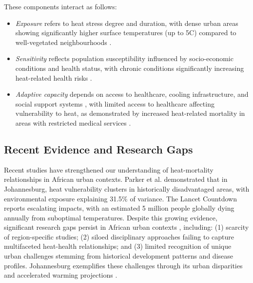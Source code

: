 These components interact as follows:
\begin{itemize}
    \item \textit{Exposure} refers to heat stress degree and duration, with dense urban areas showing significantly higher surface temperatures (up to 5\textdegree C) compared to well-vegetated neighbourhoods \citep{Li2017, Santamouris2015}.
    
    \item \textit{Sensitivity} reflects population susceptibility influenced by socio-economic conditions and health status, with chronic conditions significantly increasing heat-related health risks \citep{Watts2023, Khosla2021, Souverijns2022}.
    
    \item \textit{Adaptive capacity} depends on access to healthcare, cooling infrastructure, and social support systems \citep{Ansah2024}, with limited access to healthcare affecting vulnerability to heat, as demonstrated by increased heat-related mortality in areas with restricted medical services \citep{Murage2020}.
\end{itemize}

\subsection{Recent Evidence and Research Gaps}
Recent studies have strengthened our understanding of heat-mortality relationships in African urban contexts. Parker et al. \citep{Parker2023} demonstrated that in Johannesburg, heat vulnerability clusters in historically disadvantaged areas, with environmental exposure explaining 31.5\% of variance. The Lancet Countdown \citep{Romanello2023} reports escalating impacts, with an estimated 5 million people globally dying annually from suboptimal temperatures. Despite this growing evidence, significant research gaps persist in African urban contexts \citep{Khine2023}, including: (1) scarcity of region-specific studies; (2) siloed disciplinary approaches failing to capture multifaceted heat-health relationships; and (3) limited recognition of unique urban challenges stemming from historical development patterns and disease profiles. Johannesburg exemplifies these challenges through its urban disparities and accelerated warming projections \citep{Engelbrecht2015}.